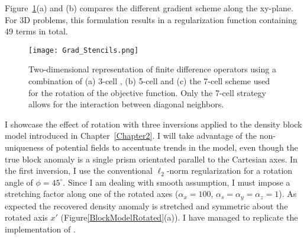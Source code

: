 Figure~\ref{Grad_Stencils}(a) and (b) compares the different gradient scheme along the xy-plane.
For 3D problems, this formulation results in a regularization function containing 49 terms in total.
\begin{figure}[h!]\centering
\texttt{[image: Grad\_Stencils.png]}
\caption{Two-dimensional representation of finite difference operators using a combination of (a) 3-cell \cite[]{LiDWO2000}, (b) 5-cell \cite[]{PhDLelievre09} and (c) the 7-cell scheme used for the rotation of the objective function. Only the 7-cell strategy allows for the interaction between diagonal neighbors.}
\label{Grad_Stencils}
\end{figure}

I showcase the effect of rotation with three inversions applied to the density block model introduced in Chapter~\ref{Chapter2}. I will take advantage of the non-uniqueness of potential fields to accentuate trends in the model, even though the true block anomaly is a single prism orientated parallel to the Cartesian axes.
In the first inversion, I use the conventional $\ell_2$-norm regularization for a rotation angle of $\phi = 45^\circ$. Since I am dealing with smooth assumption, I must impose a stretching factor along one of the rotated axes ($\alpha_x = 100$, $\alpha_s=\alpha_y=\alpha_z=1$). As expected the recovered density anomaly is stretched and symmetric about the rotated axis $x'$ (Figure\ref{BlockModelRotated}(a)). I have managed to replicate the implementation of \cite{PhDLelievre09}.

